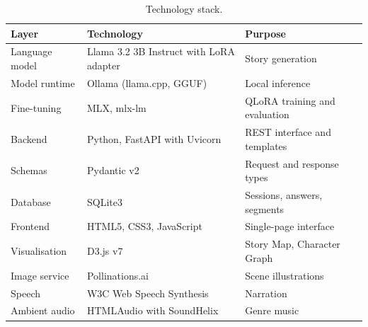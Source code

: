 \begin{table}[H]
\centering
\caption{Technology stack.}
\label{tab:stack}
\renewcommand{\arraystretch}{1.2}
\small
\begin{tabular}{@{}lll@{}}
\toprule
\textbf{Layer} & \textbf{Technology} & \textbf{Purpose} \\
\midrule
Language model   & Llama 3.2 3B Instruct with LoRA adapter & Story generation \\
Model runtime    & Ollama (llama.cpp, GGUF)         & Local inference \\
Fine-tuning      & MLX, mlx-lm                      & QLoRA training and evaluation \\
Backend          & Python, FastAPI with Uvicorn     & REST interface and templates \\
Schemas          & Pydantic v2                      & Request and response types \\
Database         & SQLite3                          & Sessions, answers, segments \\
Frontend         & HTML5, CSS3, JavaScript          & Single-page interface \\
Visualisation    & D3.js v7                         & Story Map, Character Graph \\
Image service    & Pollinations.ai                  & Scene illustrations \\
Speech           & W3C Web Speech Synthesis         & Narration \\
Ambient audio    & HTMLAudio with SoundHelix        & Genre music \\
\bottomrule
\end{tabular}
\end{table}

